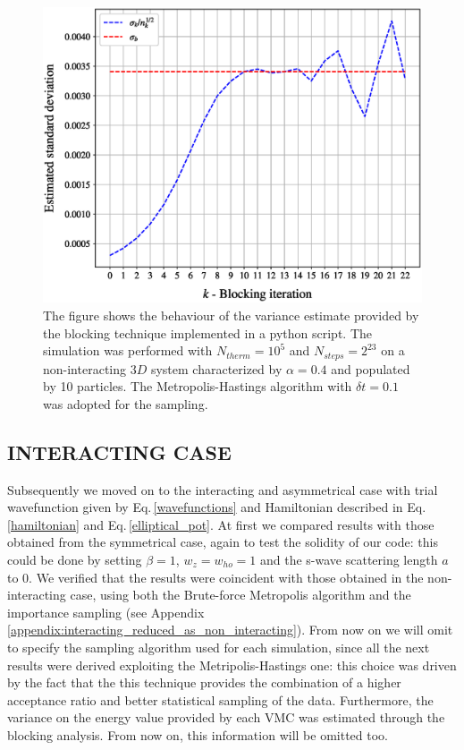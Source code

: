 \begin{figure}[H]
    \centering
    \includegraphics[scale=0.37]{images/sigma_blocking_behaviour.eps}
    \caption{The figure shows the behaviour of the variance estimate provided by the blocking technique implemented in a python script. The simulation was performed with $N_{therm}=10^5$ and $N_{steps}=2^{23}$ on a non-interacting $3D$ system characterized by $\alpha=0.4$ and populated by 10 particles. The Metropolis-Hastings algorithm with $\delta t =0.1$ was adopted for the sampling. }
    \label{fig:blocking_analysis}
\end{figure}


\subsection{INTERACTING CASE}
Subsequently we moved on to the interacting and asymmetrical case with trial wavefunction given by Eq.\,\ref{wavefunctions} and Hamiltonian described in Eq.\,\ref{hamiltonian} and Eq.\,\ref{elliptical_pot}. At first we compared results with those obtained from the symmetrical case, again to test the solidity of our code: this could be done by setting $\beta=1$, $w_z = w_{ho} = 1$ and the s-wave scattering length $a$ to 0. We verified that the results were coincident with those obtained in the non-interacting case, using both the Brute-force Metropolis algorithm and the importance sampling (see Appendix \ref{appendix:interacting_reduced_as_non_interacting}). From now on we will omit to specify the sampling algorithm used for each simulation, since all the next results were derived exploiting the Metripolis-Hastings one: this choice was driven by the fact that the this technique provides the combination of a higher acceptance ratio and better statistical sampling of the data. Furthermore, the variance on the energy value provided by each VMC was estimated through the blocking analysis. From now on, this information will be omitted too. \\

